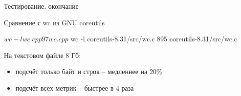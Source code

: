 \documentclass[unknownkeysallowed,xcolor=table]{beamer}
\newcommand{\textapprox}{\raisebox{0.5ex}{\texttildelow}}
\begin{document}
\begin{frame}[fragile]{Тестирование, окончание}


\end{frame}

\begin{frame}[fragile]{Сравнение с wc из GNU coreutils}

\begin{cmdline}
$ wc -l wc.cpp
97 wc.cpp

$ wc -l coreutils-8.31/src/wc.c
895 coreutils-8.31/src/wc.c
\end{cmdline}

\vspace{1em}

На текстовом файле \textapprox8 Гб:

\begin{itemize}
  \item подсчёт только байт и строк -- медленнее на 20\%
  \item подсчёт всех метрик -- быстрее в \textapprox4 раза
\end{itemize}

\end{frame}
\end{document}
